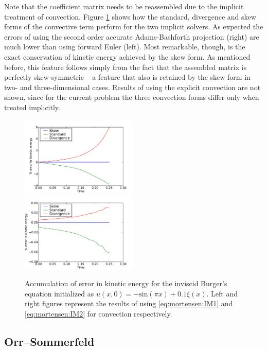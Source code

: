 Note that the coefficient matrix  needs to be reassembled due
to the implicit treatment of convection. Figure
\ref{fig:mortensen:burgers_KE} shows how the standard, divergence and
skew forms of the convective term perform for the two implicit
solvers. As expected the errors of using the second order accurate
Adams-Bashforth projection (right) are much lower than using forward
Euler (left). Most remarkable, though, is the exact conservation of
kinetic energy achieved by the skew form. As mentioned before, this
feature follows simply from the fact that the assembled matrix 
is perfectly skew-symmetric -- a feature that also is retained by the
skew form in two- and three-dimensional cases. Results of using the
explicit convection are not shown, since for the current problem the
three convection forms differ only when treated implicitly.

\begin{figure}
 \includegraphics[width=0.5\textwidth]{chapters/mortensen/pdf/Burgers_KE_IM1.pdf}
 \includegraphics[width=0.5\textwidth]{chapters/mortensen/pdf/Burgers_KE_IM2.pdf}
 \caption{ Accumulation of error in kinetic energy for the inviscid
   Burger's equation initialized as $u(x,0)=-\text{sin}(\pi x)+0.1
   \xi(x)$. Left and right figures represent the results of using
   \eqref{eq:mortensen:IM1} and \eqref{eq:mortensen:IM2} for
   convection respectively.  }
\label{fig:mortensen:burgers_KE}
\end{figure}

\subsection{Orr--Sommerfeld}
\label{sec:mortensen:OS}

